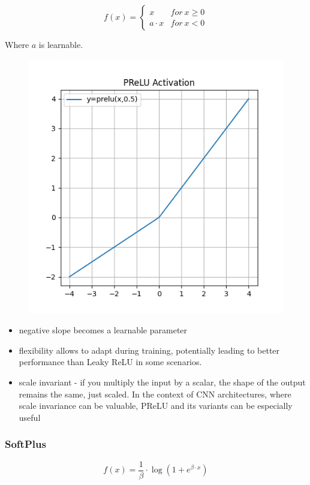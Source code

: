\documentclass[11pt]{article}
\begin{document}
\begin{definition}\label{eq:activation-prelu}
    \begin{equation*}
        f(x) = \begin{cases}
            x & for \ x \geq 0 \\ 
            a \cdot x & for \ x < 0
        \end{cases}
    \end{equation*}

    Where $a$ is learnable.
\end{definition}

\begin{figure}[H]
    \centering
    \includegraphics*[width=.4\linewidth]{figures/PReLU Activation.png}\label{fig:prelu}
\end{figure}

\begin{itemize}
    \item negative slope becomes a learnable parameter
    \item flexibility allows to adapt during training, potentially leading to better performance than Leaky ReLU in some scenarios.
    \item scale invariant - if you multiply the input by a scalar, the shape of the output remains the same, just scaled. In the context of CNN architectures, where scale invariance can be valuable, PReLU and its variants can be especially useful
\end{itemize}

\subsubsection{SoftPlus}

\begin{definition}\label{eq:activation-softplus}
    \begin{equation*}
        f(x) = \frac 1 \beta \cdot \log (1 + e ^{\beta \cdot x}) 
    \end{equation*}
\end{definition}
\end{document}
